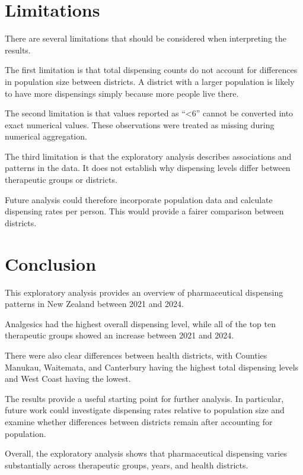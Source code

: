 \documentclass[11pt,a4paper]{report}
\begin{document}
\section{Limitations}

There are several limitations that should be considered when interpreting the results.

The first limitation is that total dispensing counts do not account for differences in population size between districts. A district with a larger population is likely to have more dispensings simply because more people live there.

The second limitation is that values reported as ``<6'' cannot be converted into exact numerical values. These observations were treated as missing during numerical aggregation.

The third limitation is that the exploratory analysis describes associations and patterns in the data. It does not establish why dispensing levels differ between therapeutic groups or districts.

Future analysis could therefore incorporate population data and calculate dispensing rates per person. This would provide a fairer comparison between districts.

\section{Conclusion}

This exploratory analysis provides an overview of pharmaceutical dispensing patterns in New Zealand between 2021 and 2024.

Analgesics had the highest overall dispensing level, while all of the top ten therapeutic groups showed an increase between 2021 and 2024.

There were also clear differences between health districts, with Counties Manukau, Waitemata, and Canterbury having the highest total dispensing levels and West Coast having the lowest.

The results provide a useful starting point for further analysis. In particular, future work could investigate dispensing rates relative to population size and examine whether differences between districts remain after accounting for population.

Overall, the exploratory analysis shows that pharmaceutical dispensing varies substantially across therapeutic groups, years, and health districts.


\end{document}
